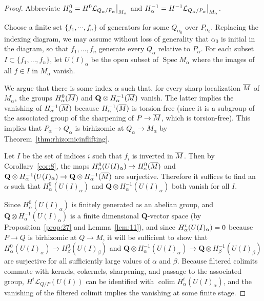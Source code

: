 \documentclass[10pt]{article}
\numberwithin{equation}{section}
\theoremstyle{definition}
\theoremstyle{remark}
\def\Spec{\operatorname{Spec}}
\def\spec{\Spec}
\DeclareMathOperator*{\colim}{colim}
\let \varinjlim \relax
\DeclareMathOperator*{\varinjlim}{colim}
\renewcommand{\bar}[1]{\overnorm{#1}\vphantom{#1}}
\def\overnorm#1{\overline{#1}\vphantom{#1}}
\begin{document}
\begin{proof}
	Abbreviate $H^0_\alpha = H^0{\cal L}_{Q_\alpha/P_\alpha}\big|_{M_\alpha}$ and $H^{-1}_\alpha = H^{-1} {\cal L}_{Q_\alpha/P_\alpha}\big|_{M_\alpha}$.




Choose a finite set $\{f_1, \cdots, f_n\}$ of generators for some $Q_{\alpha_0}$ over $P_{\alpha_0}$.  Replacing the indexing diagram, we may assume without loss of generality that $\alpha_0$ is initial in the diagram, so that $f_1, \ldots, f_n$ generate every $Q_\alpha$ relative to $P_\alpha$.  For each subset $I \subset \{ f_1, \ldots, f_n \}$, let $U(I)_\alpha$ be the open subset of $\spec M_\alpha$ where the images of all $f \in I$ in $M_\alpha$ vanish.  




	We argue that there is some index $\alpha$ such that, for every sharp localization $\bar M$ of $M_\alpha$, the groups $H^0_\alpha(\bar M)$ and $\mathbf Q \otimes H^{-1}_\alpha(\bar M)$ vanish.  The latter implies the vanishing of $H^{-1}_\alpha(\bar M)$ because $H^{-1}_\alpha(\bar M)$ is torsion-free (since it is a subgroup of the associated group of the sharpening of $P \to \bar M$, which is torsion-free).  This implies that $P_\alpha \to Q_\alpha$ is birhizomic at $Q_\alpha \to M_\alpha$ by Theorem~\ref{thm:rhizomicinflifting}.




	Let $I$ be the set of indices $i$ such that $f_i$ is inverted in $\bar M$.  Then by Corollary~\ref{cor:8}, the maps $H^0_\alpha(U(I)_\alpha) \to H^0_\alpha(\bar M)$ and $\mathbf Q \otimes H^{-1}_\alpha(U(I)_\alpha) \to \mathbf Q \otimes H^{-1}_\alpha(\bar M)$ are surjective.  Therefore it suffices to find an $\alpha$ such that $H^0_\alpha(U(I)_\alpha)$ and $\mathbf Q \otimes H^{-1}_\alpha(U(I)_\alpha)$ both vanish for all $I$.  

	Since $H^0_\alpha(U(I)_\alpha)$ is finitely generated as an abelian group, and $\mathbf Q \otimes H^{-1}_\alpha(U(I)_\alpha)$ is a finite dimensional $\mathbf Q$-vector space (by Proposition~\ref{prop:27} and Lemma~\ref{lem:11}), and since $\varinjlim H^i_\alpha(U(I)_\alpha) = 0$ because $P \to Q$ is birhizomic at $Q \to M$, it will be sufficient to show that $H^0_\alpha(U(I)_\alpha) \to H^0_\beta(U(I)_\beta)$ and $\mathbf Q \otimes H^{-1}_\alpha(U(I)_\alpha) \to \mathbf Q \otimes H^{-1}_\beta(U(I)_\beta)$ are surjective for all sufficiently large values of $\alpha$ and $\beta$.  Because filtered colimits commute with kernels, cokernels, sharpening, and passage to the associated group, $H^i \mathcal L_{Q/P}(U(I))$ can be identified with $\colim H^i_\alpha(U(I)_\alpha)$, and the vanishing of the filtered colimit implies the vanishing at some finite stage.



\end{proof}
\end{document}

